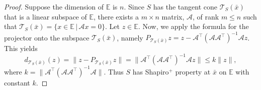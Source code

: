 \documentclass[12pt]{article}
\theoremstyle{definition}
\newcommand{\Ebb}{\mathbb{E}}
\begin{document}
\begin{proof}
Suppose the dimension of $\Ebb$ is $n$.
Since $S$ has the tangent cone $\mathcal{T}_{S}(\bar x)$ that is a linear subspace of $\Ebb$,
there exists a $m\times n$ matrix,  $\mathcal{A}$,  of rank $m\leq n$ such that
$\mathcal{T}_{S}(\bar x)=\{x\in\Ebb\,|\, \mathcal Ax=0\}$.
Let $z\in \mathbb E$.
Now, we apply the formula for the projector onto the subspace $\mathcal{T}_{S}(\bar x)$, namely
$P_{\mathcal{T}_{S}(\bar x)}z=z-\mathcal A^\top (\mathcal A\mathcal A^\top)^{-1}\mathcal Az$.
This yields
\[
d_{\mathcal T_{S}(\bar x)}(z) =\|z-P_{\mathcal T_{S}(\bar x)}z\|  =\|\mathcal A^\top (\mathcal A\mathcal A^\top)^{-1}\mathcal Az\|\le k\|z\|,
\]
where $k=\|\mathcal A^\top (\mathcal A\mathcal A^\top)^{-1}\mathcal A\|$.
Thus $S$ has Shapiro$^+$ property at $\bar x$ on $\Ebb$ with constant $k$.
\end{proof}
\end{document}
